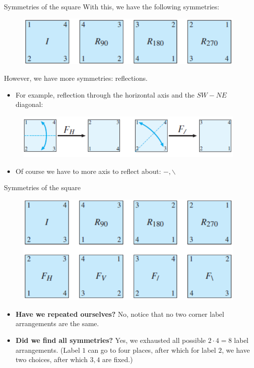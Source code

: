 \documentclass{beamer}
\def\itemb{\begin{itemize}}
\def\iteme{\end{itemize}}
\begin{document}
\begin{frame}{Symmetries of the square}
With this, we have the following symmetries:
\begin{figure}
\centering
\includegraphics[scale=0.8]{Rotations.pdf}
\end{figure}
However, we have more symmetries: reflections.
\itemb
\item For example, reflection through the horizontal axis and the $SW-NE$ diagonal:

\iteme
\begin{figure}
\centering
\includegraphics[scale=0.8]{FIFH.pdf}
\end{figure}
\itemb
\item Of course we have to more axis to reflect about: $-,\backslash$
\iteme
\end{frame}

\begin{frame}{Symmetries of the square}
\begin{figure}
\centering
\includegraphics[scale=0.8]{Allsymm.pdf}
\end{figure}
\itemb
\item \textbf{Have we repeated ourselves?} No, notice that no two corner label arrangements are the same.
\item \textbf{Did we find all symmetries?} Yes, we exhausted all possible $2\cdot 4=8$ label arrangements. (Label $1$ can go to four places, after which for label $2$, we have two choices, after which $3,4$ are fixed.)
\iteme
\end{frame}
\end{document}
